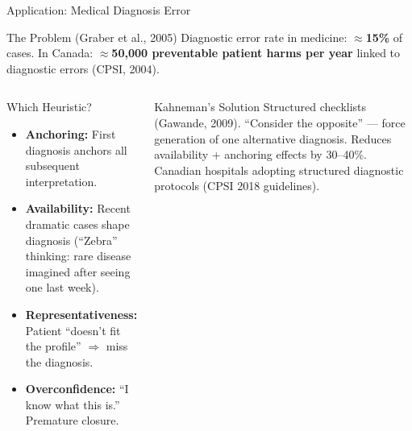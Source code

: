 \documentclass[aspectratio=169]{beamer}
\begin{document}
\begin{frame}{Application: Medical Diagnosis Error}
\begin{block}{The Problem (Graber et al., 2005)}
Diagnostic error rate in medicine: $\approx$\textbf{15\%} of cases. In Canada: $\approx$\textbf{50,000 preventable patient harms per year} linked to diagnostic errors (CPSI, 2004).
\end{block}
\begin{columns}
\begin{alertblock}{Which Heuristic?}
\begin{itemize}\small\setlength{\itemsep}{0pt}
  \item \textbf{Anchoring:} First diagnosis anchors all subsequent interpretation.
  \item \textbf{Availability:} Recent dramatic cases shape diagnosis (``Zebra'' thinking: rare disease imagined after seeing one last week).
  \item \textbf{Representativeness:} Patient ``doesn't fit the profile'' $\Rightarrow$ miss the diagnosis.
  \item \textbf{Overconfidence:} ``I know what this is.'' Premature closure.
\end{itemize}
\end{alertblock}
\begin{exampleblock}{Kahneman's Solution}
\small Structured checklists (Gawande, 2009). ``Consider the opposite'' --- force generation of one alternative diagnosis. Reduces availability + anchoring effects by 30--40\%. Canadian hospitals adopting structured diagnostic protocols (CPSI 2018 guidelines).
\end{exampleblock}
\end{columns}
\end{frame}
\end{document}
